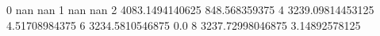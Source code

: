 0 nan nan
1 nan nan
2 4083.1494140625 848.568359375
4 3239.09814453125 4.51708984375
6 3234.5810546875 0.0
8 3237.72998046875 3.14892578125
